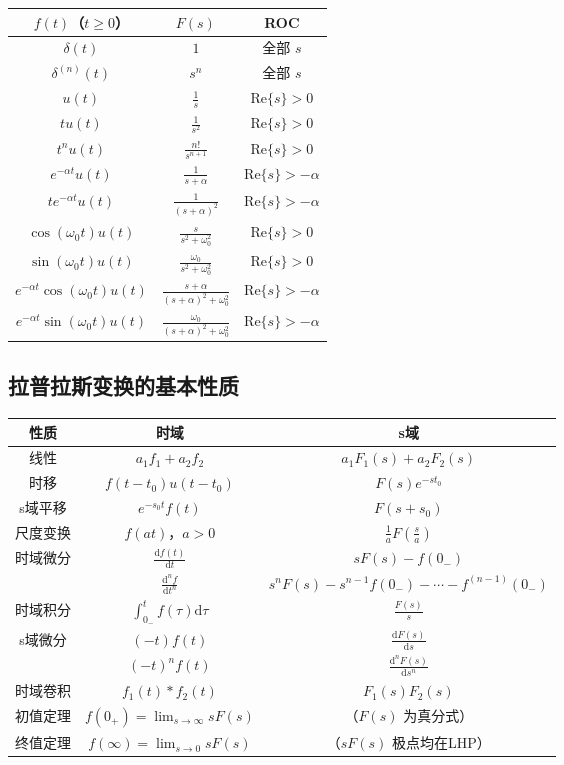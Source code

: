 \documentclass[11pt,a4paper]{ctexart}
\newcommand{\dd}{\mathrm{d}}            %
\newcommand{\dirac}{\delta}             %
\begin{document}
\begin{tabular}{c|c|c}
\toprule
$f(t)$（$t \ge 0$）& $F(s)$ & ROC \\
\midrule
$\dirac(t)$ & $1$ & 全部 $s$ \\
$\dirac^{(n)}(t)$ & $s^n$ & 全部 $s$ \\
$u(t)$ & $\frac{1}{s}$ & $\mathrm{Re}\{s\} > 0$ \\
$tu(t)$ & $\frac{1}{s^2}$ & $\mathrm{Re}\{s\} > 0$ \\
$t^nu(t)$ & $\frac{n!}{s^{n+1}}$ & $\mathrm{Re}\{s\} > 0$ \\
$e^{-\alpha t}u(t)$ & $\frac{1}{s + \alpha}$ & $\mathrm{Re}\{s\} > -\alpha$ \\
$t e^{-\alpha t}u(t)$ & $\frac{1}{(s+\alpha)^2}$ & $\mathrm{Re}\{s\} > -\alpha$ \\
$\cos(\omega_0 t)u(t)$ & $\frac{s}{s^2 + \omega_0^2}$ & $\mathrm{Re}\{s\} > 0$ \\
$\sin(\omega_0 t)u(t)$ & $\frac{\omega_0}{s^2 + \omega_0^2}$ & $\mathrm{Re}\{s\} > 0$ \\
$e^{-\alpha t}\cos(\omega_0 t)u(t)$ & $\frac{s+\alpha}{(s+\alpha)^2 + \omega_0^2}$ & $\mathrm{Re}\{s\} > -\alpha$ \\
$e^{-\alpha t}\sin(\omega_0 t)u(t)$ & $\frac{\omega_0}{(s+\alpha)^2 + \omega_0^2}$ & $\mathrm{Re}\{s\} > -\alpha$ \\
\bottomrule
\end{tabular}

\subsection{拉普拉斯变换的基本性质}

\begin{longtable}{c|c|c}
\toprule
性质 & 时域 & s域 \\
\midrule
线性 & $a_1f_1 + a_2f_2$ & $a_1F_1(s) + a_2F_2(s)$ \\
\midrule
时移 & $f(t - t_0)u(t - t_0)$ & $F(s)e^{-st_0}$ \\
\midrule
s域平移 & $e^{-s_0 t}f(t)$ & $F(s + s_0)$ \\
\midrule
尺度变换 & $f(at)$，$a > 0$ & $\frac{1}{a}F(\frac{s}{a})$ \\
\midrule
时域微分 & $\frac{\dd f(t)}{\dd t}$ & $sF(s) - f(0_-)$ \\
& $\frac{\dd^n f}{\dd t^n}$ & $s^n F(s) - s^{n-1}f(0_-) - \cdots - f^{(n-1)}(0_-)$ \\
\midrule
时域积分 & $\int_{0_-}^{t} f(\tau)\dd\tau$ & $\frac{F(s)}{s}$ \\
\midrule
s域微分 & $(-t)f(t)$ & $\frac{\dd F(s)}{\dd s}$ \\
& $(-t)^n f(t)$ & $\frac{\dd^n F(s)}{\dd s^n}$ \\
\midrule
时域卷积 & $f_1(t) * f_2(t)$ & $F_1(s)F_2(s)$ \\
\midrule
初值定理 & $f(0_+) = \lim_{s\to\infty} sF(s)$ & （$F(s)$ 为真分式） \\
\midrule
终值定理 & $f(\infty) = \lim_{s\to 0} sF(s)$ & （$sF(s)$ 极点均在LHP） \\
\bottomrule
\end{longtable}
\end{document}
